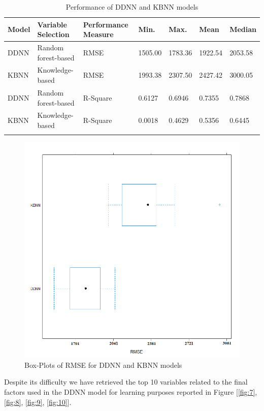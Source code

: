 \documentclass[preprint,12pt]{elsarticle}
\begin{document}
\begin{table}[H]
\centering
\caption{Performance of DDNN and KBNN models}
\begin{tabular}{lllllll}
\hline
Model & Variable Selection  & Performance Measure & Min.    & Max.    & Mean    & Median  \\
\hline
DDNN  & Random forest-based & RMSE                & 1505.00 & 1783.36 & 1922.54 & 2053.58 \\
KBNN  & Knowledge-based     & RMSE                & 1993.38 & 2307.50 & 2427.42 & 3000.05 \\
DDNN  & Random forest-based & R-Square            & 0.6127  & 0.6946  & 0.7355  & 0.7868  \\
KBNN  & Knowledge-based     & R-Square            & 0.0018  & 0.4629  & 0.5356  & 0.6445 \\
\hline
\label{tab:Performance}
\end{tabular}
\end{table}


\begin{figure}[H]
\centering\includegraphics[width=0.7\linewidth]{boxplot.png}
\caption{Box-Plots of RMSE for DDNN and KBNN models} 
\label{fig:2}
\end{figure}


Despite its difficulty we have retrieved the top 10 variables related to the final factors used in the DDNN model for learning purposes reported in Figure [\ref{fig:7}, \ref{fig:8}, \ref{fig:9}, \ref{fig:10}].  
\end{document}
